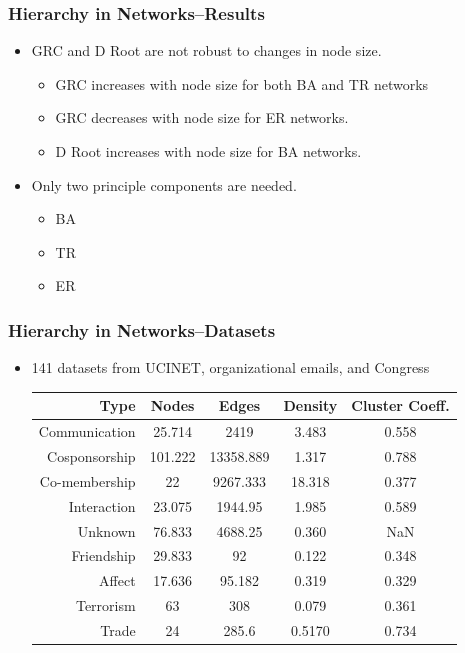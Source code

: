 \documentclass[xcolor={table}]{beamer}
\begin{document}
\begin{frame}\frametitle{Hierarchy in Networks--Results}
	\begin{itemize}
		\item GRC and D Root are not robust to changes in node size.
		\begin{itemize}
			\item GRC increases with node size for both BA and TR networks
			\item GRC decreases with node size for ER networks. 
			\item D Root increases with node size for BA networks.
		\end{itemize}
		\item Only two principle components are needed.
		\begin{itemize}
			\item BA
			\item TR
			\item ER
		\end{itemize} 
	\end{itemize}
\end{frame}

\begin{frame}\frametitle{Hierarchy in Networks--Datasets}
	\begin{itemize}
		\item 141 datasets from UCINET, organizational emails, and Congress
		\vspace{.2in}
		\scriptsize
		\begin{table}
			\begin{tabular}{| r || c | c | c | c |}
				\hline
				Type & Nodes & Edges & Density & Cluster Coeff. \\
				\hline
				Communication & 25.714  &2419  &3.483 &  0.558 \\
				Cosponsorship &101.222 &13358.889  &1.317  & 0.788\\
				Co-membership & 22  &9267.333 &18.318  & 0.377\\
				Interaction & 23.075 & 1944.95 & 1.985   &  0.589\\
				Unknown & 76.833 & 4688.25 & 0.360   &  	NaN\\
				Friendship & 29.833  &  92 & 0.122    &  0.348\\
				Affect & 17.636  &  95.182 & 0.319      &	0.329\\
				Terrorism & 63 &  308 & 0.079    &  0.361\\
				Trade & 24 &  285.6 & 0.5170     &  0.734\\
				\hline
			\end{tabular}
		\end{table}
	\end{itemize}
\end{frame}
\end{document}
